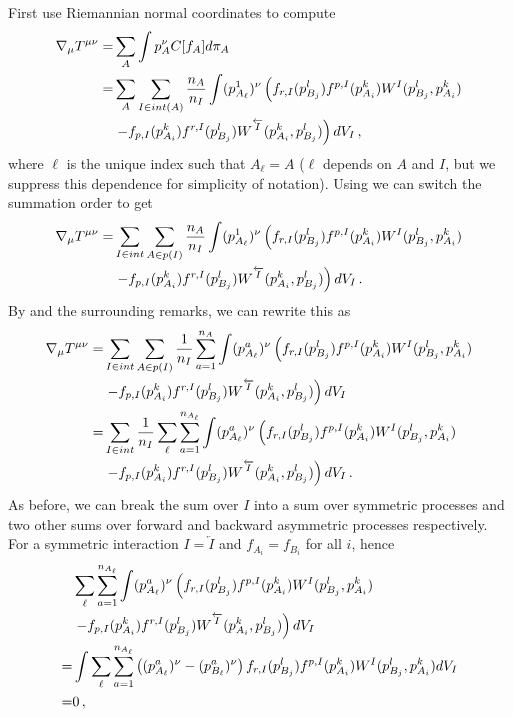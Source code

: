 First use Riemannian normal coordinates to compute
\begin{align}
\nabla_\mu T^{\mu\nu}=&\sum_A \int p_A^\nu C[f_A]d\pi_A\\
=&\sum_A\sum_{I\in int(A)}\frac{n_A}{n_I}\int (p^1_{A_\ell})^\nu\left(f_{r,I}(p_{B_j}^l)f^{p,I}(p_{A_i}^k)W^I(p_{B_j}^l,p_{A_i}^k) \right.\\
&\left. -f_{p,I}(p_{A_i}^k)f^{r,I}(p_{B_j}^l)W^{\overleftarrow{I}}(p_{A_i}^k,p_{B_j}^l)\right)  dV_I\,,\notag
\end{align}
where $\ell$ is the unique index such that $A_\ell=A$ ($\ell$ depends on $A$ and $I$, but we suppress this dependence for simplicity of notation). Using  we can switch the summation order to get
\begin{align}
\nabla_\mu T^{\mu\nu}=&\sum_{I\in int}\sum_{A\in p(I)} \frac{n_A}{n_I}\int (p^1_{A_\ell})^{\nu}\left(f_{r,I}(p_{B_j}^l)f^{p,I}(p_{A_i}^k)W^I(p_{B_j}^l,p_{A_i}^k) \right.\\
&\left. -f_{p,I}(p_{A_i}^k)f^{r,I}(p_{B_j}^l)W^{\overleftarrow{I}}(p_{A_i}^k,p_{B_j}^l)\right)  dV_I\notag\,.
\end{align}
By  and the surrounding remarks, we can rewrite this as
\begin{align}\label{del_T_sum}
\nabla_\mu T^{\mu\nu}=&\sum_{I\in int}\sum_{A\in p(I)} \frac{1}{n_I}\sum_{a=1}^{n_A}\int (p^a_{A_\ell})^{\nu}\left(f_{r,I}(p_{B_j}^l)f^{p,I}(p_{A_i}^k)W^I(p_{B_j}^l,p_{A_i}^k) \right.\\
&\left. -f_{p,I}(p_{A_i}^k)f^{r,I}(p_{B_j}^l)W^{\overleftarrow{I}}(p_{A_i}^k,p_{B_j}^l)\right)  dV_I\notag\\
=&\sum_{I\in int} \frac{1}{n_I}\sum_{\ell}\sum_{a=1}^{n_{A_\ell}}\int (p_{A_\ell}^a)^{\nu}\left(f_{r,I}(p_{B_j}^l)f^{p,I}(p_{A_i}^k)W^I(p_{B_j}^l,p_{A_i}^k) \right.\notag\\
&\left. -f_{p,I}(p_{A_i}^k)f^{r,I}(p_{B_j}^l)W^{\overleftarrow{I}}(p_{A_i}^k,p_{B_j}^l)\right)  dV_I\,.\notag
\end{align}
As before, we can break the sum over $I$ into a sum over symmetric processes and two other sums over forward and backward asymmetric processes respectively.  For a symmetric interaction $I=\overleftarrow{I}$ and $f_{A_i}=f_{B_i}$ for all $i$, hence
\begin{align}
&\sum_\ell\sum_{a=1}^{n_{A_\ell}}\int (p_{A_\ell}^a)^{\nu}\left(f_{r,I}(p_{B_j}^l)f^{p,I}(p_{A_i}^k)W^I(p_{B_j}^l,p_{A_i}^k) \right.\\
&\left. -f_{p,I}(p_{A_i}^k)f^{r,I}(p_{B_j}^l)W^{\overleftarrow{I}}(p_{A_i}^k,p_{B_j}^l)\right)  dV_I\notag\\
=&\int\sum_\ell\sum_{a=1}^{n_{A_\ell}}\left((p_{A_\ell}^a)^\nu- (p_{B_\ell}^a)^{\nu}\right) f_{r,I}(p_{B_j}^l)f^{p,I}(p_{A_i}^k)W^I(p_{B_j}^l,p_{A_i}^k) dV_I\notag\\
=& 0\,,\notag
\end{align}
